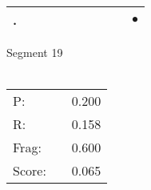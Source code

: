 \documentclass[landscape]{article}
\newcommand{\ssp}{\hspace{2pt}}
\newcommand{\mex}{\cellcolor{g}$\bullet$}
\begin{document}
\begin{tabular}{|l|p{10pt}|p{10pt}|p{10pt}|p{10pt}|p{10pt}|p{10pt}|p{10pt}|p{10pt}|p{10pt}|}
\hline
\ssp \cellcolor{ref8}. \ssp&\hspace{2pt}&\hspace{2pt}&\hspace{2pt}&\hspace{2pt}&\hspace{2pt}&\hspace{2pt}&\hspace{2pt}&\hspace{2pt}&\hspace{2pt}\mex\\
\hline
\end{tabular}

\vspace{6pt}
\noindent Segment 19\\\\
\noindent\begin{tabular}{lm{12pt}r}
\hline
P:&&0.200\\
R:&&0.158\\
Frag:&&0.600\\
Score:&&0.065\\
\end{tabular}

\newpage
\end{document}

